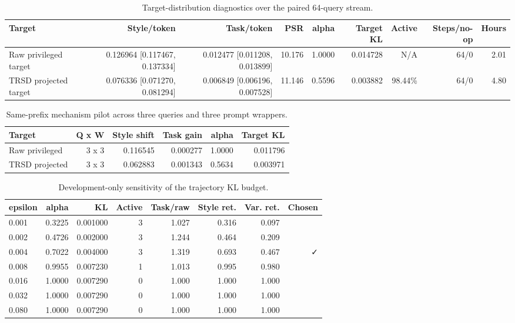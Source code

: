 \begin{table}[t]
\centering
\small
\caption{Target-distribution diagnostics over the paired 64-query stream.}
\label{tab:trsd-target}
\begin{tabular}{lrrrrrrrr}
\toprule
Target & Style/token & Task/token & PSR & alpha & Target KL & Active & Steps/no-op & Hours \\
\midrule
Raw privileged target & 0.126964 [0.117467, 0.137334] & 0.012477 [0.011208, 0.013899] & 10.176 & 1.0000 & 0.014728 & N/A & 64/0 & 2.01 \\
TRSD projected target & 0.076336 [0.071270, 0.081294] & 0.006849 [0.006196, 0.007528] & 11.146 & 0.5596 & 0.003882 & 98.44\% & 64/0 & 4.80 \\
\bottomrule
\end{tabular}
\end{table}

\begin{table}[t]
\centering
\small
\caption{Same-prefix mechanism pilot across three queries and three prompt wrappers.}
\label{tab:trsd-same-prefix}
\begin{tabular}{lrrrrr}
\toprule
Target & Q x W & Style shift & Task gain & alpha & Target KL \\
\midrule
Raw privileged & 3 x 3 & 0.116545 & 0.000277 & 1.0000 & 0.011796 \\
TRSD projected & 3 x 3 & 0.062883 & 0.001343 & 0.5634 & 0.003971 \\
\bottomrule
\end{tabular}
\end{table}

\begin{table}[t]
\centering
\small
\caption{Development-only sensitivity of the trajectory KL budget.}
\label{tab:trsd-epsilon}
\begin{tabular}{lrrrrrrr}
\toprule
epsilon & alpha & KL & Active & Task/raw & Style ret. & Var. ret. & Chosen \\
\midrule
0.001 & 0.3225 & 0.001000 & 3 & 1.027 & 0.316 & 0.097 &  \\
0.002 & 0.4726 & 0.002000 & 3 & 1.244 & 0.464 & 0.209 &  \\
0.004 & 0.7022 & 0.004000 & 3 & 1.319 & 0.693 & 0.467 & ✓ \\
0.008 & 0.9955 & 0.007230 & 1 & 1.013 & 0.995 & 0.980 &  \\
0.016 & 1.0000 & 0.007290 & 0 & 1.000 & 1.000 & 1.000 &  \\
0.032 & 1.0000 & 0.007290 & 0 & 1.000 & 1.000 & 1.000 &  \\
0.080 & 1.0000 & 0.007290 & 0 & 1.000 & 1.000 & 1.000 &  \\
\bottomrule
\end{tabular}
\end{table}

